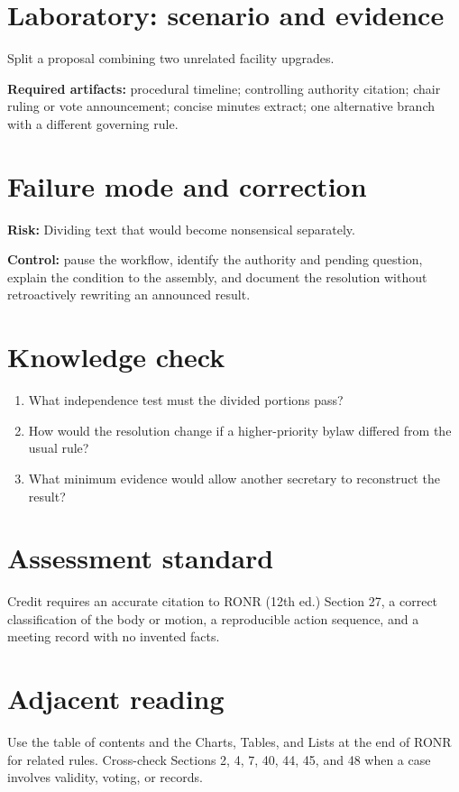 \documentclass[11pt]{article}
\begin{document}
\section{Laboratory: scenario and evidence}
Split a proposal combining two unrelated facility upgrades.

\textbf{Required artifacts:} procedural timeline; controlling authority citation; chair ruling or vote announcement; concise minutes extract; one alternative branch with a different governing rule.

\section{Failure mode and correction}
\textbf{Risk:} Dividing text that would become nonsensical separately.

\textbf{Control:} pause the workflow, identify the authority and pending question, explain the condition to the assembly, and document the resolution without retroactively rewriting an announced result.

\section{Knowledge check}
\begin{enumerate}[leftmargin=*,itemsep=4pt]
\item What independence test must the divided portions pass?
\item How would the resolution change if a higher-priority bylaw differed from the usual rule?
\item What minimum evidence would allow another secretary to reconstruct the result?
\end{enumerate}

\section{Assessment standard}
Credit requires an accurate citation to RONR (12th ed.) Section 27, a correct classification of the body or motion, a reproducible action sequence, and a meeting record with no invented facts.

\section{Adjacent reading}
Use the table of contents and the Charts, Tables, and Lists at the end of RONR for related rules. Cross-check Sections 2, 4, 7, 40, 44, 45, and 48 when a case involves validity, voting, or records.
\end{document}
